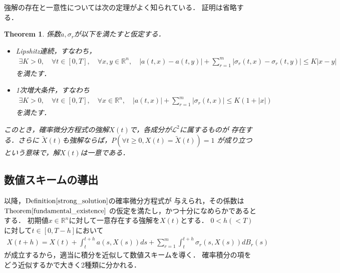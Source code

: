 \documentclass[dvipdfmx,autodetect-engine]{jsarticle}
\newtheorem{theorem}{Theorem}[section]
\theoremstyle{remark}
\theoremstyle{definition}
\newcommand{\R}{\mathbb{R}}
\newcommand{\abs}[1]{\left\lvert#1\right\rvert}
\begin{document}
強解の存在と一意性については次の定理がよく知られている．
証明は省略する．


\begin{theorem}\label{fundamental_existence}
    係数$a,\sigma_{r}$が以下を満たすと仮定する．
    \begin{itemize}
        \item Lipshitz連続，すなわち，
        \begin{align}
            \exists K>0,\quad \forall t \in [0,T],\quad \forall x,y \in \R^{n},\quad
            \abs{a(t,x)-a(t,y)} + \sum_{r=1}^{m} \abs{\sigma_{r}(t,x) - \sigma_{r}(t,y)} 
            \leq K\abs{x-y}
        \end{align}
        を満たす．
        \item 1次増大条件，すなわち
        \begin{align}
            \exists K>0,\quad \forall t \in [0,T],\quad \forall x\in \R^{n},\quad
            \abs{a(t,x)} + \sum_{r=1}^{m} \abs{\sigma_{r}(t,x)} \leq K(1+\abs{x})
        \end{align}
        を満たす．
    \end{itemize}
    このとき，確率微分方程式の強解$X(t)$で，各成分が$\mathcal{L}^2$に属するものが
    存在する．さらに
    $\tilde{X}(t)$も強解ならば，$P(\forall t \geq 0,X(t)=\tilde{X}(t))=1$
    が成り立つという意味で，解$X(t)$は一意である．
\end{theorem}


\subsection{数値スキームの導出}
以降，$\mathrm{Definition}\ref{strong_solution}$の確率微分方程式が
与えられ，その係数は$\mathrm{Theorem}\ref{fundamental_existence}$
の仮定を満たし，かつ十分になめらかであるとする．
初期値$x \in \R^n$に対して一意存在する強解を$X(t)$とする．
$0<h(<T)$に対して$t \in [0,T-h]$において
\begin{align}
    X(t+h) = X(t) + \int_{t}^{t+h} a(s,X(s))ds + 
    \sum_{r=1}^{m} \int_{t}^{t+h} \sigma_{r}(s,X(s))dB_{r}(s)
\end{align}
が成立するから，適当に積分を近似して数値スキームを導く．
確率積分の項をどう近似するかで大きく2種類に分かれる．
\end{document}
